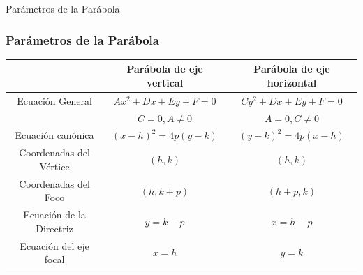 \documentclass[xcolor={dvipsnames},aspectratio=169,10pt]{beamer}
\begin{document}
\begin{frame}{Parámetros de la Parábola}
  \frametitle{Parámetros de la Parábola}

  \begin{table}[]
    \begin{tabular}{|c|c|c|}
    \hline
    & Parábola de eje vertical & Parábola de eje horizontal \\ \hline
    Ecuación General & $Ax^2 + Dx + Ey + F = 0$ & $Cy^2 + Dx + Ey + F = 0$ \\ 
    & $C = 0, A\neq0$ & $A = 0, C\neq 0$ \\ \hline
    Ecuación canónica & $(x-h)^2 = 4p(y-k)$ & $(y-k)^2 = 4p(x-h)$ \\ \hline
    Coordenadas del Vértice & $(h, k)$ & $(h, k)$ \\ \hline
    Coordenadas del Foco & $(h, k+p)$ & $(h+p, k)$ \\ \hline
    Ecuación de la Directriz & $y=k-p$ & $x=h-p$ \\ \hline
    Ecuación del eje focal & $x=h$ & $y=k$ \\ \hline
    \end{tabular}
  \end{table}
\end{frame}
\end{document}
